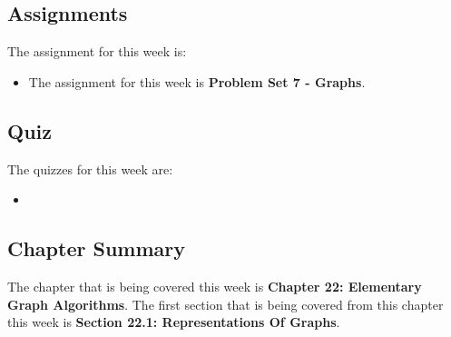 \subsection{Assignments}

The assignment for this week is:

\begin{itemize}
    \item The assignment for this week is \textbf{Problem Set 7 - Graphs}. 
\end{itemize}

\subsection{Quiz}

The quizzes for this week are:

\begin{itemize}
    \item {} \textbullet {} 
\end{itemize}

\subsection{Chapter Summary}

The chapter that is being covered this week is \textbf{Chapter 22: Elementary Graph Algorithms}. The first section that is being covered from this chapter this week is \textbf{Section 22.1: Representations Of Graphs}.

